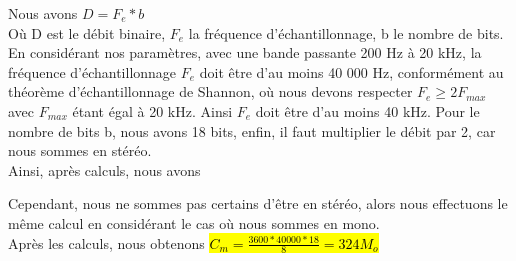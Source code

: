 Nous avons $D = F_e * b$
\\
Où D est le débit binaire, $F_e$ la fréquence d'échantillonnage, b le nombre de bits.
\\
En considérant nos paramètres, avec une bande passante 200 Hz à 20 kHz, la fréquence d'échantillonnage $F_e$ doit être d'au moins 40 000 Hz, conformément au théorème d'échantillonnage de Shannon, où nous devons respecter $F_e\ge 2F_{max}$ avec $F_{max}$ étant égal à 20 kHz. Ainsi $F_e$ doit être d'au moins 40 kHz. Pour le nombre de bits b, nous avons 18 bits, enfin, il faut multiplier le débit par 2, car nous sommes en stéréo. 
\\
Ainsi, après calculs, nous avons

Cependant, nous ne sommes pas certains d'être en stéréo, alors nous effectuons le même calcul en considérant le cas où nous sommes en mono.
\\
Après les calculs, nous obtenons \hl{$C_m = \frac{3600*40 000*18}{8} = 324 M_o$}